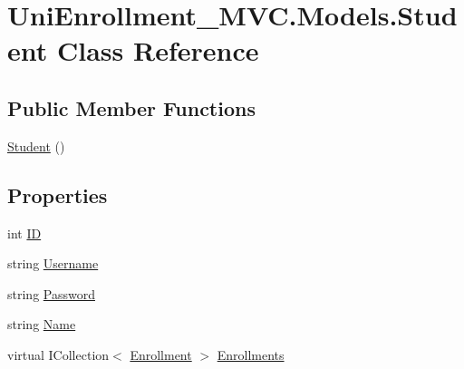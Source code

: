 \hypertarget{class_uni_enrollment___m_v_c_1_1_models_1_1_student}{}\section{Uni\+Enrollment\+\_\+\+M\+V\+C.\+Models.\+Student Class Reference}
\label{class_uni_enrollment___m_v_c_1_1_models_1_1_student}
\subsection*{Public Member Functions}
\begin{DoxyCompactItemize}
\item 
\hyperlink{class_uni_enrollment___m_v_c_1_1_models_1_1_student_a20ccd261b61dab5def3fdd2c40d3681b}{Student} ()
\end{DoxyCompactItemize}
\subsection*{Properties}
\begin{DoxyCompactItemize}
\item 
int \hyperlink{class_uni_enrollment___m_v_c_1_1_models_1_1_student_af90e9ea91812385aeacb0d8016a6ac4d}{ID}
\item 
string \hyperlink{class_uni_enrollment___m_v_c_1_1_models_1_1_student_a58b520c5e708debc5604ed96caa8fa3f}{Username}
\item 
string \hyperlink{class_uni_enrollment___m_v_c_1_1_models_1_1_student_ad31ea99bde5adc6008eb13d8e897cdab}{Password}
\item 
string \hyperlink{class_uni_enrollment___m_v_c_1_1_models_1_1_student_ab45cd7a456ecc65eb17b5b72f8b117d4}{Name}
\item 
virtual I\+Collection$<$ \hyperlink{class_uni_enrollment___m_v_c_1_1_models_1_1_enrollment}{Enrollment} $>$ \hyperlink{class_uni_enrollment___m_v_c_1_1_models_1_1_student_a75f0808c2128b7a52546735a26df2d49}{Enrollments}
\end{DoxyCompactItemize}


